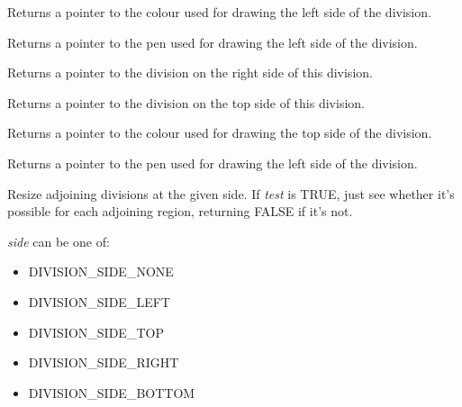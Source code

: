 Returns a pointer to the colour used for drawing the left side of the division.



Returns a pointer to the pen used for drawing the left side of the division.



Returns a pointer to the division on the right side of this division.



Returns a pointer to the division on the top side of this division.



Returns a pointer to the colour used for drawing the top side of the division.



Returns a pointer to the pen used for drawing the left side of the division.



Resize adjoining divisions at the given side. If {\it test} is TRUE,
just see whether it's possible for each adjoining region,
returning FALSE if it's not.

{\it side} can be one of:

\begin{itemize}\itemsep=0pt
\item DIVISION\_SIDE\_NONE
\item DIVISION\_SIDE\_LEFT
\item DIVISION\_SIDE\_TOP
\item DIVISION\_SIDE\_RIGHT
\item DIVISION\_SIDE\_BOTTOM
\end{itemize}


